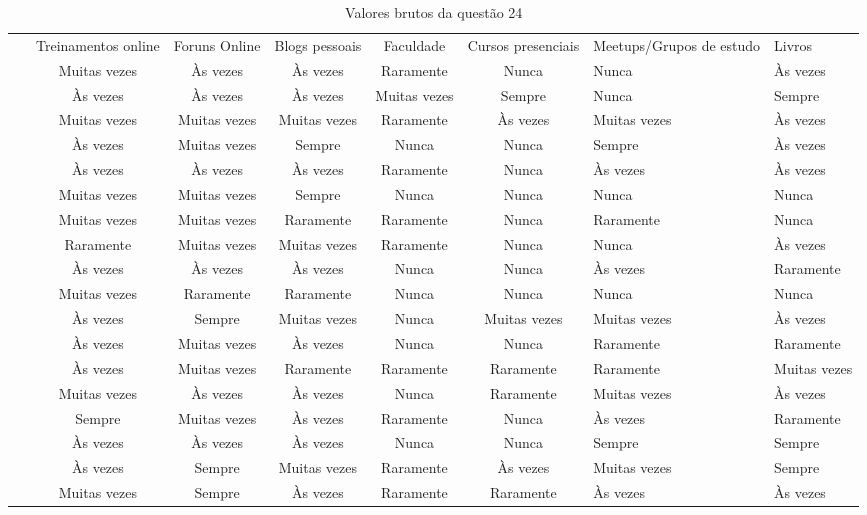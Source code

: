 \documentclass[twoside,english,brazilian]{UNISINOSartigo}
\begin{document}
\begin{table}[h]
\footnotesize
    \caption{Valores brutos da questão 24}
    \begin{tabularx}{\columnwidth}{cccccc}
    \hline
~ & Treinamentos online & Foruns Online & Blogs pessoais & Faculdade & Cursos presenciais & Meetups/Grupos de estudo & Livros \\ 
~ & Muitas vezes & Às vezes & Às vezes & Raramente & Nunca & Nunca & Às vezes \\ 
~ & Às vezes & Às vezes & Às vezes & Muitas vezes & Sempre & Nunca & Sempre \\ 
~ & Muitas vezes & Muitas vezes & Muitas vezes & Raramente & Às vezes & Muitas vezes & Às vezes \\ 
~ & Às vezes & Muitas vezes & Sempre & Nunca & Nunca & Sempre & Às vezes \\ 
~ & Às vezes & Às vezes & Às vezes & Raramente & Nunca & Às vezes & Às vezes \\ 
~ & Muitas vezes & Muitas vezes & Sempre & Nunca & Nunca & Nunca & Nunca \\ 
~ & Muitas vezes & Muitas vezes & Raramente & Raramente & Nunca & Raramente & Nunca \\ 
~ & Raramente & Muitas vezes & Muitas vezes & Raramente & Nunca & Nunca & Às vezes \\ 
~ & Às vezes & Às vezes & Às vezes & Nunca & Nunca & Às vezes & Raramente \\ 
~ & Muitas vezes & Raramente & Raramente & Nunca & Nunca & Nunca & Nunca \\ 
~ & Às vezes & Sempre & Muitas vezes & Nunca & Muitas vezes & Muitas vezes & Às vezes \\ 
~ & Às vezes & Muitas vezes & Às vezes & Nunca & Nunca & Raramente & Raramente \\ 
~ & Às vezes & Muitas vezes & Raramente & Raramente & Raramente & Raramente & Muitas vezes \\ 
~ & Muitas vezes & Às vezes & Às vezes & Nunca & Raramente & Muitas vezes & Às vezes \\ 
~ & Sempre & Muitas vezes & Às vezes & Raramente & Nunca & Às vezes & Raramente \\ 
~ & Às vezes & Às vezes & Às vezes & Nunca & Nunca & Sempre & Sempre \\ 
~ & Às vezes & Sempre & Muitas vezes & Raramente & Às vezes & Muitas vezes & Sempre \\ 
~ & Muitas vezes & Sempre & Às vezes & Raramente & Raramente & Às vezes & Às vezes \\ 

\end{tabularx}
\end{table}
\end{document}
